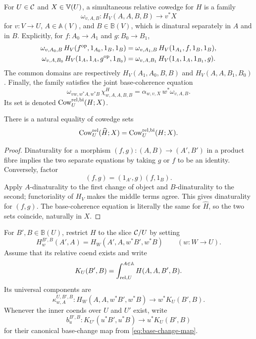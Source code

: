 \begin{definition}
\label{def:simultaneous-cowedge}
For \(U\in\mathcal{C}\) and \(X\in\mathbb{V}(U)\), a simultaneous relative cowedge for
\(H\) is a family
\[
  \omega_{v,A,B}:H_V(A,A,B,B)\longrightarrow v^*X
\]
for \(v:V\to U\), \(A\in\mathbb A(V)\), and
\(B\in\mathbb B(V)\), which is dinatural separately in \(A\) and in
\(B\).  Explicitly, for \(f:A_0\to A_1\) and \(g:B_0\to B_1\),
\begin{align}
 \omega_{v,A_0,B}\,
 H_V(f^{\mathrm{op}},1_{A_0},1_B,1_B)
 &=
 \omega_{v,A_1,B}\,
 H_V(1_{A_1},f,1_B,1_B),
 \label{eq:simultaneous-A-dinaturality}\\
 \omega_{v,A,B_0}\,
 H_V(1_A,1_A,g^{\mathrm{op}},1_{B_0})
 &=
 \omega_{v,A,B_1}\,
 H_V(1_A,1_A,1_{B_1},g).
 \label{eq:simultaneous-B-dinaturality}
\end{align}
The common domains are respectively
\(H_V(A_1,A_0,B,B)\) and \(H_V(A,A,B_1,B_0)\).
Finally, the family satisfies the joint base-coherence equation
\[
  \omega_{vw,w^*A,w^*B}\,\chi^H_{w,A,A,B,B}
  =\alpha_{w,v,X}\,w^*\omega_{v,A,B}.
\]
Its set is denoted \(\operatorname{Cow}^{\mathrm{rel},\mathrm{bi}}_U(H;X)\).
\end{definition}

\begin{lemma}
\label{lem:product-dinaturality}
There is a natural equality of cowedge sets
\[
  \operatorname{Cow}^{\mathrm{rel}}_U(\widehat H;X)
  =\operatorname{Cow}^{\mathrm{rel},\mathrm{bi}}_U(H;X).
\]
\end{lemma}

\begin{proof}
Dinaturality for a morphism \((f,g):(A,B)\to(A',B')\) in a product fibre
implies the two separate equations by taking \(g\) or \(f\) to be an
identity.  Conversely, factor
\[
  (f,g)=(1_{A'},g)(f,1_B).
\]
Apply \(A\)-dinaturality to the first change of object and
\(B\)-dinaturality to the second; functoriality of \(H_V\) makes the middle
terms agree.  This gives dinaturality for \((f,g)\).  The base-coherence
equation is literally the same for \(\widehat H\), so the two sets coincide,
naturally in \(X\).
\end{proof}

For \(B',B\in\mathbb B(U)\), restrict \(H\) to the slice \(\mathcal{C}/U\) by
setting
\[
  H^{B',B}_w(A',A)
  =H_W(A',A,w^*B',w^*B)
  \qquad(w:W\to U).
\]
Assume that its relative coend exists and write
\begin{equation}
  K_U(B',B)=
  \mathop{\int^{A\in\mathbb A}_{\mathrm{rel},U}}
  H(A,A,B',B).
  \label{eq:inner-K}
\end{equation}
Its universal components are
\begin{equation}
  \kappa^{U,B',B}_{w,A}:
  H_W(A,A,w^*B',w^*B)\longrightarrow w^*K_U(B',B).
  \label{eq:kappa-components}
\end{equation}
Whenever the inner coends over \(U\) and \(U'\) exist, write
\begin{equation}
  b_u^{B',B}:
  K_{U'}(u^*B',u^*B)\longrightarrow u^*K_U(B',B)
  \label{eq:K-base-map}
\end{equation}
for their canonical base-change map from \cref{eq:base-change-map}.

